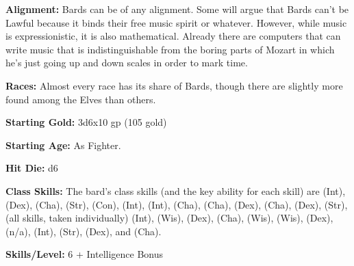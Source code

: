 
\textbf{Alignment:} Bards can be of any alignment. Some will argue that Bards can't be Lawful because it binds their free music spirit or whatever. However, while music is expressionistic, it is also mathematical. Already there are computers that can write music that is indistinguishable from the boring parts of Mozart in which he's just going up and down scales in order to mark time.

\textbf{Races:} Almost every race has its share of Bards, though there are slightly more found among the Elves than others.

\textbf{Starting Gold:} 3d6x10 gp (105 gold)

\textbf{Starting Age:} As Fighter.

\textbf{Hit Die:} d6

\textbf{Class Skills:} The bard's class skills (and the key ability for each skill) are  (Int),  (Dex),  (Cha),  (Str),  (Con),  (Int),  (Int),  (Cha),  (Cha),  (Dex),  (Cha),  (Dex),  (Str),  (all skills, taken individually) (Int),  (Wis),  (Dex),  (Cha),  (Wis),  (Wis),  (Dex),  (n/a),  (Int),  (Str),  (Dex), and  (Cha).

\textbf{Skills/Level:} 6 + Intelligence Bonus

\modebab{}
\poorfor{}
\goodref{}
\goodwil{}

\begin{minorcastingclasstable}
\end{minorcastingclasstable}



